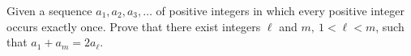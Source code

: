 Given a sequence $a_1,a_2,a_3,\ldots $ of positive integers in which every positive integer occurs exactly once. Prove that there exist integers $\ell $ and $m,\ 1<\ell <m$,  such that $a_1+a_m=2a_{\ell}$.